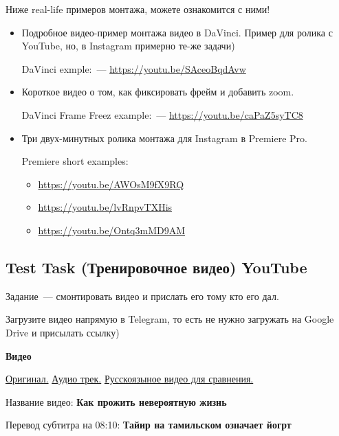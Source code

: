 \documentclass[
a4paper, %
12pt, %
article,
onecolumn, %
openany, %
]{memoir}
\begin{document}
Ниже real-life примеров монтажа, можете ознакомится с ними!
\begin{itemize}
    \item Подробное видео-пример монтажа видео в DaVinci. 
        Пример для ролика с YouTube, но, в 
        Instagram примерно те-же задачи)
        
        DaVinci exmple:~--- \href{https://youtu.be/SAceoBqdAvw}{https://youtu.be/SAceoBqdAvw}
    \item Короткое видео о том, как фиксировать фрейм и добавить zoom.

        DaVinci Frame Freez example:~--- \href{https://youtu.be/caPaZ5syTC8}{https://youtu.be/caPaZ5syTC8}

\item Три двух-минутных ролика монтажа для Instagram в Premiere Pro.

    Premiere short examples:
    \begin{itemize}
        \item \href{https://youtu.be/AWOsM9fX9RQ}{https://youtu.be/AWOsM9fX9RQ}
        \item \href{https://youtu.be/lvRnpvTXHis}{https://youtu.be/lvRnpvTXHis}
        \item \href{https://youtu.be/Ontq3mMD9AM}{https://youtu.be/Ontq3mMD9AM}
    \end{itemize}
\end{itemize}


\subsection{Test Task (Тренировочное видео) YouTube}
 
Задание~--- смонтировать видео и прислать его тому кто его дал. 

Загрузите видео напрямую в Telegram, то есть не нужно 
загружать на Google Drive и присылать ссылку)

\begin{center} \textbf{Видео} \end{center}
\href{https://www.youtube.com/watch?v=9sGJUR7stzc}{Оригинал.}
\quad
\href{https://drive.google.com/file/d/1Y6ECjMSvkaUFmNawIePfFvqS2ZnB3SPi/view?usp=sharing}{Аудио трек.}
\quad
\href{https://www.youtube.com/watch?v=Q3NYDF4JyTg}{Русскоязыное видео для сравнения.}

Название видео: \textbf{Как прожить невероятную жизнь}
	
Перевод субтитра на 08:10: \textbf{Тайир на тамильском означает йогрт}
\end{document}
